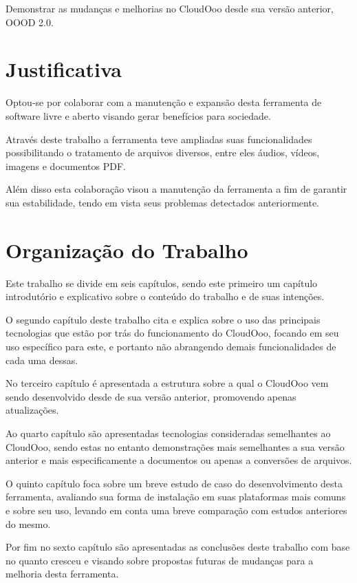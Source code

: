Demonstrar as mudanças e melhorias no CloudOoo desde sua versão anterior, OOOD 2.0.


\section{Justificativa}

Optou-se por colaborar com a manutenção e expansão desta ferramenta de software livre e aberto visando gerar benefícios para sociedade.

Através deste trabalho a ferramenta teve ampliadas suas funcionalidades possibilitando o tratamento de arquivos diversos, entre eles áudios, vídeos, imagens e documentos PDF.

Além disso esta colaboração visou a manutenção da ferramenta a fim de garantir sua estabilidade, tendo em vista seus problemas detectados anteriormente. 

\section{Organização do Trabalho}

Este trabalho se divide em seis capítulos, sendo este primeiro um capítulo introdutório e explicativo sobre o conteúdo do trabalho e de suas intenções.

O segundo capítulo deste trabalho cita e explica sobre o uso das principais tecnologias que estão por trás do funcionamento do CloudOoo, focando em seu uso específico para este, e portanto não abrangendo demais funcionalidades de cada uma dessas.

No terceiro capítulo é apresentada a estrutura sobre a qual o CloudOoo vem sendo desenvolvido desde de sua versão anterior, promovendo apenas  atualizações.

Ao quarto capítulo são apresentadas tecnologias consideradas semelhantes ao CloudOoo, sendo estas no entanto demonstrações mais semelhantes a sua versão anterior e mais especificamente a documentos ou apenas a conversões de arquivos.

O quinto capítulo foca sobre um breve estudo de caso do desenvolvimento desta ferramenta, avaliando sua forma de instalação em suas plataformas mais comuns e sobre seu uso, levando em conta uma breve comparação com estudos anteriores do mesmo.

Por fim no sexto capítulo são apresentadas as conclusões deste trabalho com base no quanto cresceu e visando sobre propostas futuras de mudanças para a melhoria desta ferramenta.
